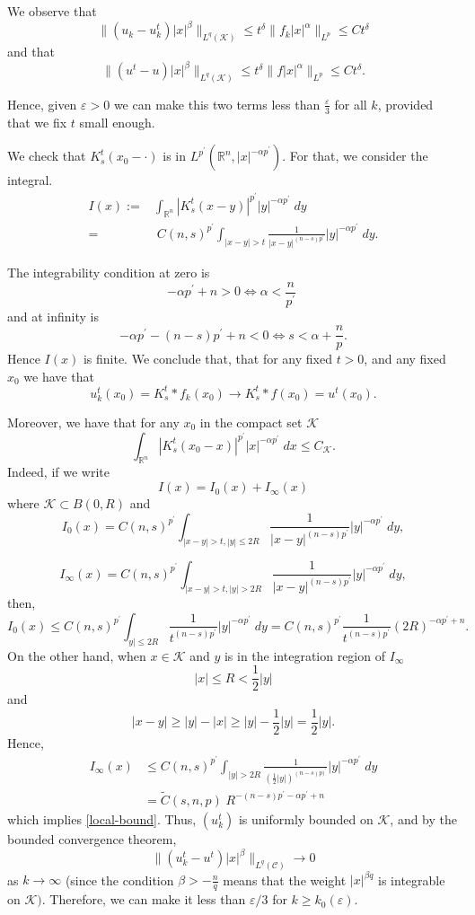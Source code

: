 \documentclass[12pt]{amsart}
\newcommand {\R}{\mathbb{R}}
\newcommand {\be}{\begin{equation}}
\newcommand {\ee}{\end{equation}}
\begin{document}
We observe that
$$ \| (u_k - u_k^t) |x|^\beta  \|_{L^q(\mathcal{K})} \leq t^{\delta} \| f_k |x|^\alpha \|_{L^p}
\leq C t^\delta $$
and that
$$ \| (u^t - u) |x|^\beta  \|_{L^q(\mathcal{K})} \leq t^{\delta} \| f |x|^\alpha \|_{L^p} 
\leq C t^\delta.$$

Hence, given $\varepsilon>0$ we can make this two terms less than $\frac{\varepsilon}{3}$ 
for all $k$, provided that we fix $t$ small enough. 

We check that $K_s^t(x_0-\cdot )$ is in $L^{p^\prime}(\R^n,|x|^{-\alpha p^\prime})$. For that,
we consider the integral.
\begin{align*}
I(x) :=& \int_{\R^n} |K_s^t(x-y)|^{p^\prime} |y|^{-\alpha p^\prime} \; dy \\
=& \; C(n,s)^{p^\prime} \int_{|x-y|>t} \frac{1}{|x-y|^{(n-s)p^\prime}}
|y|^{-\alpha p^\prime} \; dy.
\end{align*}

The integrability  condition at zero is
$$ -\alpha p^\prime + n >0 \Leftrightarrow \alpha < \frac{n}{p^\prime} \;  $$
and at infinity is
$$ -\alpha p^\prime -(n-s)p^\prime +n <0 \Leftrightarrow s < \alpha + \frac{n}{p}. $$
Hence $I(x)$ is finite. We conclude that, that for any fixed $t>0$, and any fixed $x_0$ we have that
$$ u_{k}^t(x_0) = K_s^t * f_k(x_0) \to K_s^t * f(x_0) = u^t(x_0).$$

Moreover, we have that for any $x_0$ in the compact set $\mathcal{K}$
\be \int_{\R^n} |K_s^t(x_0-x)|^{p^\prime} |x|^{-\alpha p^\prime} \; dx \leq C_{\mathcal{K}}. \label{local-bound}\ee
Indeed, if we write
$$ I(x)= I_0(x) + I_\infty(x) $$
where $\mathcal{K} \subset B(0,R)$ and 
$$ I_0(x) = C(n,s)^{p^\prime} \int_{|x-y|>t,|y|\leq 2R} \frac{1}{|x-y|^{(n-s)p^\prime}}
|y|^{-\alpha p^\prime} \; dy,$$

$$ I_\infty(x) = C(n,s)^{p^\prime} \int_{|x-y|>t,|y|> 2R} \frac{1}{|x-y|^{(n-s)p^\prime}}
|y|^{-\alpha p^\prime} \; dy,$$
then,
$$ I_0(x) \leq C(n,s)^{p^\prime} \int_{y|\leq 2R} \frac{1}{t^{(n-s)p^\prime}}
|y|^{-\alpha p^\prime} \; dy = C(n,s)^{p^\prime} \frac{1}{t^{(n-s)p^\prime}} (2R)^{-\alpha p^\prime+n}.$$
On the other hand, when $x \in \mathcal{K}$ and $y$ is in the integration region of $I_\infty$
$$ |x|\leq R < \frac{1}{2} |y| $$
and
$$ |x-y| \geq |y|-|x| \geq |y| - \frac{1}{2} |y| = \frac{1}{2} |y|.$$
Hence,
\begin{align*} I_\infty(x) &\leq  C(n,s)^{p^\prime} \int_{|y|> 2R} \frac{1}{\left(\frac{1}{2}|y|\right)^{(n-s)p)^\prime}}
|y|^{-\alpha p^\prime} \; dy \\
&= \tilde{C}(s,n,p) \; R^{-(n-s)p^\prime-\alpha p^\prime + n} 
\end{align*}
which implies \eqref{local-bound}. Thus, $(u^t_k)$ is uniformly
bounded on $\mathcal{K}$, and by the bounded convergence theorem,
$$ \| (u_k^t - u^t) |x|^\beta  \|_{L^q(\mathcal{C})} \to 0 $$
as $k \to \infty$ (since the condition $\beta > -\frac nq$ means that the weight 
$|x|^{\beta q}$ is integrable on $\mathcal{K})$. Therefore, we can make it less than $\varepsilon/3$ for $k \geq k_0(\varepsilon)$.
\end{document}
